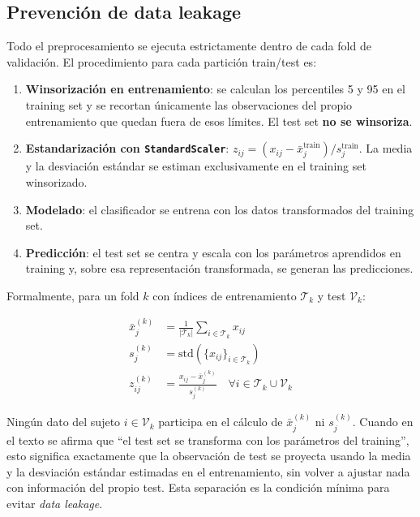 \subsection{Prevención de data leakage}

Todo el preprocesamiento se ejecuta estrictamente dentro de cada fold de validación. El procedimiento para cada partición train/test es:

\begin{enumerate}
    \item \textbf{Winsorización en entrenamiento}: se calculan los percentiles 5 y 95 en el training set y se recortan
     únicamente las observaciones del propio entrenamiento que quedan fuera de esos límites. El test set \textbf{no se winsoriza}.
    \item \textbf{Estandarización con \texttt{StandardScaler}}: $z_{ij} = (x_{ij} - \bar{x}_j^{\text{train}}) / s_j^{\text{train}}$. La media y la desviación estándar se estiman exclusivamente en el training set winsorizado.
    \item \textbf{Modelado}: el clasificador se entrena con los datos transformados del training set.
    \item \textbf{Predicción}: el test set se centra y escala con los parámetros aprendidos en training y, sobre esa representación transformada, se generan las predicciones.
\end{enumerate}

Formalmente, para un fold $k$ con índices de entrenamiento $\mathcal{T}_k$ y test $\mathcal{V}_k$:

\begin{align}
\bar{x}_j^{(k)} &= \frac{1}{|\mathcal{T}_k|} \sum_{i \in \mathcal{T}_k} x_{ij} \\
s_j^{(k)} &= \text{std}(\{x_{ij}\}_{i \in \mathcal{T}_k}) \\
z_{ij}^{(k)} &= \frac{x_{ij} - \bar{x}_j^{(k)}}{s_j^{(k)}} \quad \forall i \in \mathcal{T}_k \cup \mathcal{V}_k
\end{align}

Ningún dato del sujeto $i \in \mathcal{V}_k$ participa en el cálculo de $\bar{x}_j^{(k)}$ ni $s_j^{(k)}$. Cuando en el texto se afirma que ``el test set se transforma con los parámetros del training'', esto significa exactamente que la observación de test se proyecta usando la media y la desviación estándar estimadas en el entrenamiento, sin volver a ajustar nada con información del propio test. Esta separación es la condición mínima para evitar \textit{data leakage}.

